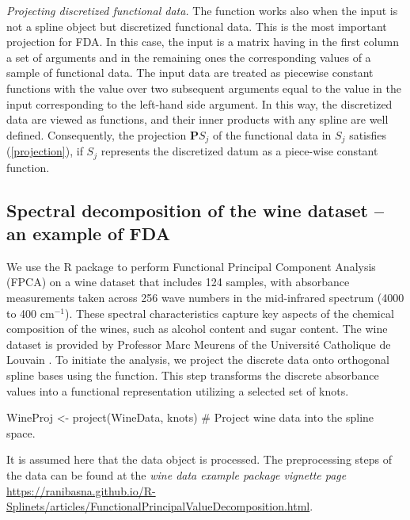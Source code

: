 \noindent\emph{Projecting discretized functional data.}
The function  works also when the input is not a spline object but discretized functional data.
This is the most important projection for FDA. 
In this case, the input is a matrix having in the first column a set of arguments and in the remaining ones the corresponding values of a sample of functional data. 
The input data are treated as piecewise constant functions with the value over two subsequent arguments equal to the value in the input corresponding
to the left-hand side argument.
In this way, the discretized data are viewed as functions, and their inner products with any spline are well defined. 
Consequently, the projection $\mathbf P S_j$ of the functional data in $S_j$ satisfies (\ref{projection}), if $S_j$ represents the discretized datum as a  piece-wise constant function. 

\vspace{-.13cm}
\subsection{Spectral decomposition of the wine dataset -- an example of FDA}\vspace{-.22cm}

We use the  R package to perform Functional Principal Component Analysis (FPCA) on a wine dataset that includes 124 samples, with absorbance measurements taken across 256 wave numbers in the mid-infrared spectrum (4000 to 400 cm$^{-1}$). These spectral characteristics capture key aspects of the chemical composition of the wines, such as alcohol content and sugar content. The wine dataset is provided by Professor Marc Meurens of the Université Catholique de Louvain \citep{benoudjit2004}. To initiate the analysis, we project the discrete data onto orthogonal spline bases using the  function. This step transforms the discrete absorbance values into a functional representation utilizing a selected set of knots.

\begin{example}
WineProj <- project(WineData, knots) # Project wine data into the spline space.
\end{example}

It is assumed here that the  data object is processed. The preprocessing steps of the data can be found at the \emph{wine data example package vignette page} \url{https://ranibasna.github.io/R-Splinets/articles/FunctionalPrincipalValueDecomposition.html}.

